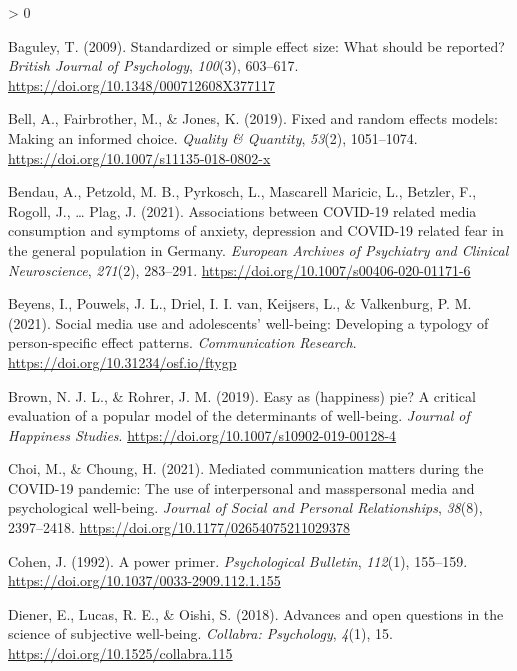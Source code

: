 \documentclass[
  english,
  man,floatsintext]{apa6}
\newlength{\cslhangindent}
\newenvironment{CSLReferences}[2] %
 {%
  \setlength{\parindent}{0pt}
  \ifodd #1 \everypar{\setlength{\hangindent}{\cslhangindent}}\ignorespaces\fi
  \ifnum #2 > 0
  \setlength{\parskip}{#2\baselineskip}
  \fi
 }%
 {}
\begin{document}
\hypertarget{refs}{}
\begin{CSLReferences}{1}{0}
\leavevmode\hypertarget{ref-baguleyStandardizedSimpleEffect2009}{}%
Baguley, T. (2009). Standardized or simple effect size: {What} should be reported? \emph{British Journal of Psychology}, \emph{100}(3), 603--617. \url{https://doi.org/10.1348/000712608X377117}

\leavevmode\hypertarget{ref-bellFixedRandomEffects2019}{}%
Bell, A., Fairbrother, M., \& Jones, K. (2019). Fixed and random effects models: Making an informed choice. \emph{Quality \& Quantity}, \emph{53}(2), 1051--1074. \url{https://doi.org/10.1007/s11135-018-0802-x}

\leavevmode\hypertarget{ref-bendauAssociationsCOVID19Related2021}{}%
Bendau, A., Petzold, M. B., Pyrkosch, L., Mascarell Maricic, L., Betzler, F., Rogoll, J., \ldots{} Plag, J. (2021). Associations between {COVID}-19 related media consumption and symptoms of anxiety, depression and {COVID}-19 related fear in the general population in {Germany}. \emph{European Archives of Psychiatry and Clinical Neuroscience}, \emph{271}(2), 283--291. \url{https://doi.org/10.1007/s00406-020-01171-6}

\leavevmode\hypertarget{ref-beyensSocialMediaUse2021}{}%
Beyens, I., Pouwels, J. L., Driel, I. I. van, Keijsers, L., \& Valkenburg, P. M. (2021). Social media use and adolescents' well-being: {Developing} a typology of person-specific effect patterns. \emph{Communication Research}. \url{https://doi.org/10.31234/osf.io/ftygp}

\leavevmode\hypertarget{ref-brownEasyHappinessPie2019}{}%
Brown, N. J. L., \& Rohrer, J. M. (2019). Easy as (happiness) pie? {A} critical evaluation of a popular model of the determinants of well-being. \emph{Journal of Happiness Studies}. \url{https://doi.org/10.1007/s10902-019-00128-4}

\leavevmode\hypertarget{ref-choiMediatedCommunicationMatters2021}{}%
Choi, M., \& Choung, H. (2021). Mediated communication matters during the {COVID}-19 pandemic: {The} use of interpersonal and masspersonal media and psychological well-being. \emph{Journal of Social and Personal Relationships}, \emph{38}(8), 2397--2418. \url{https://doi.org/10.1177/02654075211029378}

\leavevmode\hypertarget{ref-cohenPowerPrimer1992}{}%
Cohen, J. (1992). A power primer. \emph{Psychological Bulletin}, \emph{112}(1), 155--159. \url{https://doi.org/10.1037/0033-2909.112.1.155}

\leavevmode\hypertarget{ref-dienerAdvancesOpenQuestions2018}{}%
Diener, E., Lucas, R. E., \& Oishi, S. (2018). Advances and open questions in the science of subjective well-being. \emph{Collabra: Psychology}, \emph{4}(1), 15. \url{https://doi.org/10.1525/collabra.115}


\end{CSLReferences}
\end{document}
